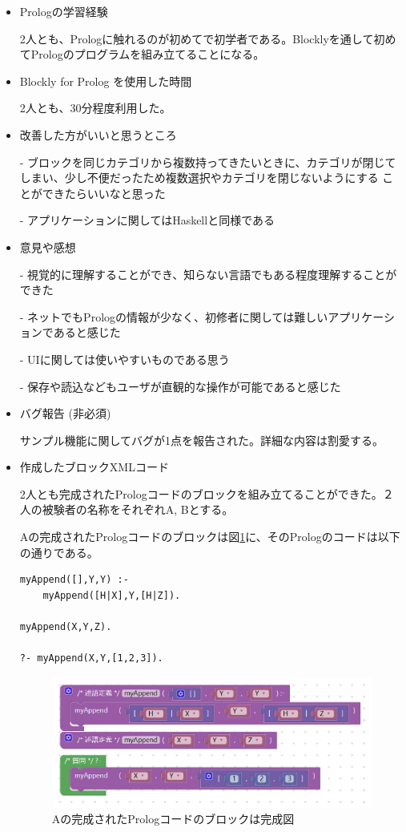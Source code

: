 \documentclass{risepaper}
\begin{document}
\begin{itemize}
\item Prologの学習経験

2人とも、Prologに触れるのが初めてで初学者である。Blocklyを通して初めてPrologのプログラムを組み立てることになる。

\item Blockly for Prolog を使用した時間

2人とも、30分程度利用した。

\item 改善した方がいいと思うところ

- ブロックを同じカテゴリから複数持ってきたいときに、カテゴリが閉じてしまい、少し不便だったため複数選択やカテゴリを閉じないようにする
ことができたらいいなと思った

- アプリケーションに関してはHaskellと同様である

\item 意見や感想

- 視覚的に理解することができ、知らない言語でもある程度理解することができた

- ネットでもPrologの情報が少なく、初修者に関しては難しいアプリケーションであると感じた

- UIに関しては使いやすいものである思う

- 保存や読込などもユーザが直観的な操作が可能であると感じた

\item バグ報告 (非必須)

サンプル機能に関してバグが1点を報告された。詳細な内容は割愛する。

\item 作成したブロックXMLコード

2人とも完成されたPrologコードのブロックを組み立てることができた。２人の被験者の名称をそれぞれA, Bとする。

Aの完成されたPrologコードのブロックは図\ref{fig:prolog_experiment_result_a}に、そのPrologのコードは以下の通りである。
\begin{lstlisting}[basicstyle=\ttfamily\footnotesize]
myAppend([],Y,Y) :-
    myAppend([H|X],Y,[H|Z]).

myAppend(X,Y,Z).

?- myAppend(X,Y,[1,2,3]).
\end{lstlisting}

\begin{figure}[h]
\begin{center}
\includegraphics[scale=0.5]{img/prolog_experiment_result_a.PNG}
\caption{Aの完成されたPrologコードのブロックは完成図}%
\label{fig:prolog_experiment_result_a}
\end{center}%
\end{figure}%


\end{itemize}
\end{document}
